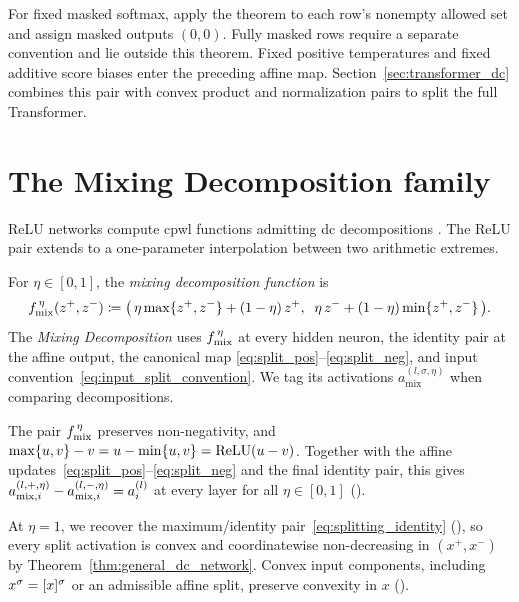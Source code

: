 For fixed masked softmax, apply the theorem to each row's nonempty allowed set and assign masked outputs $(0,0)$. Fully masked rows require a separate convention and lie outside this theorem. Fixed positive temperatures and fixed additive score biases enter the preceding affine map. Section~\ref{sec:transformer_dc} combines this pair with convex product and normalization pairs to split the full Transformer.

\section{The Mixing Decomposition family}\label{sec:mixing_decomposition}

ReLU networks compute \ac{cpwl} functions \parencite{Arora2018} admitting \ac{dc} decompositions \parencite{Melzer1986_PLasDC,Kripfganz1987_PWAasDC,hiddenMono}. The ReLU pair extends to a one-parameter interpolation between two arithmetic extremes.

\begin{definition}\label{def:fmix}
For $\eta \in [0,1]$, the \emph{mixing decomposition function} is
\begin{equation}
	f_{\mathrm{mix}}^{\,\eta}(z^+, z^-) \coloneqq \bigl(\, \eta \max\{z^+, z^-\} + (1-\eta)\, z^+, \;\; \eta\, z^- + (1-\eta) \min\{z^+, z^-\} \,\bigr).
	\label{eq:fmix_def}
\end{equation}
The \emph{Mixing Decomposition} uses $f_{\mathrm{mix}}^{\,\eta}$ at every hidden neuron, the identity pair at the affine output, the canonical map \eqref{eq:split_pos}--\eqref{eq:split_neg}, and input convention~\eqref{eq:input_split_convention}. We tag its activations $a_{\mathrm{mix}}^{(l,\sigma,\eta)}$ when comparing decompositions.
\end{definition}

The pair $f_{\mathrm{mix}}^{\,\eta}$ preserves non-negativity, and $\max\{u,v\}-v=u-\min\{u,v\}=\text{ReLU}(u-v)$. Together with the affine updates~\eqref{eq:split_pos}--\eqref{eq:split_neg} and the final identity pair, this gives $a_{\mathrm{mix},i}^{(l,+,\eta)}-a_{\mathrm{mix},i}^{(l,-,\eta)}=a^{(l)}_i$ at every layer for all $\eta\in[0,1]$ ().

At $\eta=1$, we recover the maximum/identity pair~\eqref{eq:splitting_identity} (), so every split activation is convex and coordinatewise non-decreasing in $(x^+,x^-)$ by Theorem~\ref{thm:general_dc_network}. Convex input components, including $x^\sigma=[x]^{\sigma}$ or an admissible affine split, preserve convexity in $x$ ().

